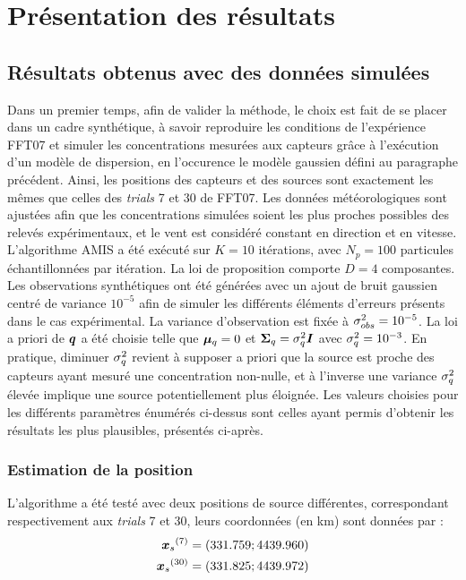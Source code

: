{\section{Présentation des résultats}

\subsection{Résultats obtenus avec des données simulées}
\label{par_simule}

Dans un premier temps, afin de valider la méthode, le choix est fait de se placer dans un cadre synthétique, à savoir reproduire les conditions de l'expérience FFT07 et simuler les concentrations mesurées aux capteurs grâce à l'exécution d'un modèle de dispersion, en l'occurence le modèle gaussien défini au paragraphe précédent. Ainsi, les positions des capteurs et des sources sont exactement les mêmes que celles des \textit{trials} 7 et 30 de FFT07. Les données météorologiques sont ajustées afin que les concentrations simulées soient les plus proches possibles des relevés expérimentaux, et le vent est considéré constant en direction et en vitesse. \\

L'algorithme AMIS a été exécuté sur $K = 10$ itérations, avec $N_p = 100$ particules échantillonnées par itération. {La loi de proposition comporte $D=4$ composantes.} Les observations synthétiques ont été générées avec un ajout de bruit gaussien centré de variance $10^{-5}$ afin de simuler les différents éléments d'erreurs présents dans le cas expérimental. La variance d'observation est fixée à ${\sigma_{obs}^2} = 10^{-5}$. La loi a priori de ${\bm{q}}$ a été choisie telle que ${\bm{\mu}_q} = 0$ et ${\bm{\Sigma}_q} = \sigma_q^2 \bm{I}$ avec $\sigma_q^2 = 10^{-3}$. En pratique, diminuer $\sigma_q^2$ revient à supposer {a priori} que la source est proche des capteurs ayant mesuré une concentration non-nulle, et à l'inverse une variance $\sigma_q^2$ élevée implique une source potentiellement plus éloignée. 
{Les valeurs choisies} pour les différents paramètres énumérés ci-dessus sont celles ayant permis d'obtenir les résultats les plus plausibles, présentés ci-après. \\

\subsubsection{Estimation de la position}

L'algorithme a été testé avec deux positions de source différentes, correspondant respectivement aux \textit{trials} 7 et 30, leurs coordonnées (en km) sont données par : 
\begin{equation}
\begin{split}
{\bm{x}_s}^{(7)} &= (331.759;4439.960) \\
{\bm{x}_s}^{(30)} &= (331.825;4439.972)
\end{split}
\end{equation}

}

